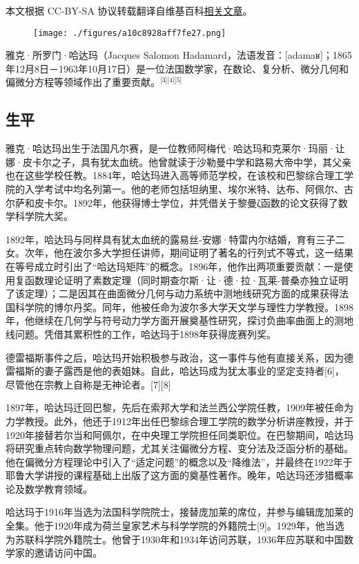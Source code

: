 
本文根据 CC-BY-SA 协议转载翻译自维基百科\href{https://en.wikipedia.org/wiki/Jacques_Hadamard}{相关文章}。

\begin{figure}[ht]
\centering
\texttt{[image: ./figures/a10c8928aff7fe27.png]}
\caption{} \label{fig_YKadm_1}
\end{figure}
雅克·所罗门·哈达玛（Jacques Salomon Hadamard，法语发音：[adamaʁ]；1865年12月8日－1963年10月17日）是一位法国数学家，在数论、复分析、微分几何和偏微分方程等领域作出了重要贡献。\(^\text{[3][4][5]}\)
\subsection{生平}
雅克·哈达玛出生于法国凡尔赛，是一位教师阿梅代·哈达玛和克莱尔·玛丽·让娜·皮卡尔之子，具有犹太血统。他曾就读于沙勒曼中学和路易大帝中学，其父亲也在这些学校任教。1884年，哈达玛进入高等师范学校，在该校和巴黎综合理工学院的入学考试中均名列第一。他的老师包括坦纳里、埃尔米特、达布、阿佩尔、古尔萨和皮卡尔。1892年，他获得博士学位，并凭借关于黎曼ζ函数的论文获得了数学科学院大奖。

1892年，哈达玛与同样具有犹太血统的露易丝-安娜·特雷内尔结婚，育有三子二女。次年，他在波尔多大学担任讲师，期间证明了著名的行列式不等式，这一结果在等号成立时引出了“哈达玛矩阵”的概念。1896年，他作出两项重要贡献：一是使用复函数理论证明了素数定理（同时期查尔斯·让·德·拉·瓦莱-普桑亦独立证明了该定理）；二是因其在曲面微分几何与动力系统中测地线研究方面的成果获得法国科学院的博尔丹奖。同年，他被任命为波尔多大学天文学与理性力学教授。1898年，他继续在几何学与符号动力学方面开展奠基性研究，探讨负曲率曲面上的测地线问题。凭借其累积性的工作，哈达玛于1898年获得庞赛列奖。

德雷福斯事件之后，哈达玛开始积极参与政治，这一事件与他有直接关系，因为德雷福斯的妻子露西是他的表姐妹。自此，哈达玛成为犹太事业的坚定支持者[6]，尽管他在宗教上自称是无神论者。[7][8]

1897年，哈达玛迁回巴黎，先后在索邦大学和法兰西公学院任教，1909年被任命为力学教授。此外，他还于1912年出任巴黎综合理工学院的数学分析讲座教授，并于1920年接替若尔当和阿佩尔，在中央理工学院担任同类职位。在巴黎期间，哈达玛将研究重点转向数学物理问题，尤其关注偏微分方程、变分法及泛函分析的基础。他在偏微分方程理论中引入了“适定问题”的概念以及“降维法”，并最终在1922年于耶鲁大学讲授的课程基础上出版了这方面的奠基性著作。晚年，哈达玛还涉猎概率论及数学教育领域。

哈达玛于1916年当选为法国科学院院士，接替庞加莱的席位，并参与编辑庞加莱的全集。他于1920年成为荷兰皇家艺术与科学学院的外籍院士[9]。1929年，他当选为苏联科学院外籍院士。他曾于1930年和1934年访问苏联，1936年应苏联和中国数学家的邀请访问中国。

